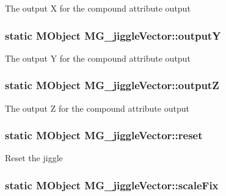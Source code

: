 The output X for the compound attribute output \hypertarget{class_m_g__jiggle_vector_aa19e7d9b0b5f5f2066186a2106be7cb6}{
\subsubsection[{output\-Y}]{\setlength{\rightskip}{0pt plus 5cm}static M\-Object M\-G\-\_\-jiggle\-Vector\-::output\-Y\hspace{0.3cm}{\ttfamily [static]}}}\label{class_m_g__jiggle_vector_aa19e7d9b0b5f5f2066186a2106be7cb6}
The output Y for the compound attribute output \hypertarget{class_m_g__jiggle_vector_a774f838b90e3bc2b823cffd43636ff43}{
\subsubsection[{output\-Z}]{\setlength{\rightskip}{0pt plus 5cm}static M\-Object M\-G\-\_\-jiggle\-Vector\-::output\-Z\hspace{0.3cm}{\ttfamily [static]}}}\label{class_m_g__jiggle_vector_a774f838b90e3bc2b823cffd43636ff43}
The output Z for the compound attribute output \hypertarget{class_m_g__jiggle_vector_a215dfaa566c1c46b1b248704298e588a}{
\subsubsection[{reset}]{\setlength{\rightskip}{0pt plus 5cm}static M\-Object M\-G\-\_\-jiggle\-Vector\-::reset\hspace{0.3cm}{\ttfamily [static]}}}\label{class_m_g__jiggle_vector_a215dfaa566c1c46b1b248704298e588a}
Reset the jiggle \hypertarget{class_m_g__jiggle_vector_aaf10913674da4674212e007b6175d140}{
\subsubsection[{scale\-Fix}]{\setlength{\rightskip}{0pt plus 5cm}static M\-Object M\-G\-\_\-jiggle\-Vector\-::scale\-Fix\hspace{0.3cm}{\ttfamily [static]}}}\label{class_m_g__jiggle_vector_aaf10913674da4674212e007b6175d140}
